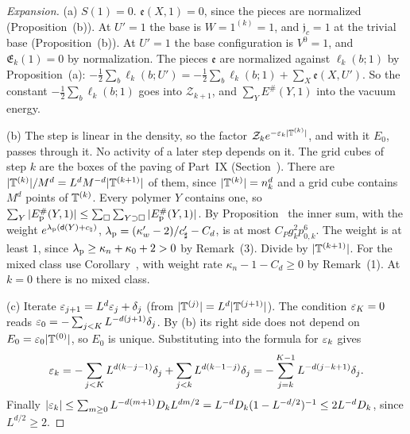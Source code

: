 \begin{proof}[Expansion]
(a) $S(1)=0$. $\mathfrak e(X,1)=0$, since the pieces are normalized (Proposition~(b)). At $U'=1$ the base is $W=1^{(k)}=1$, and $\mathfrak j_c=1$ at the trivial base (Proposition~(b)). At $U'=1$ the base configuration is $V^0=1$, and $\mathfrak E_k(1)=0$ by normalization. The pieces $\mathfrak e$ are normalized against $\ell_k(b;1)$ by Proposition~(a): $-\frac12\sum_b\ell_k(b;U')=-\frac12\sum_b\ell_k(b;1)+\sum_X\mathfrak e(X,U')$. So the constant $-\frac12\sum_b\ell_k(b;1)$ goes into $\mathcal Z_{k+1}$, and $\sum_YE^\#(Y,1)$ into the vacuum energy.

(b) The step is linear in the density, so the factor $\mathcal Z_ke^{-\varepsilon_k|\mathbb T^{(k)}|}$, and with it $E_0$, passes through it. No activity of a later step depends on it. The grid cubes of step $k$ are the boxes of the paving of Part~IX (Section~). There are $|\mathbb T^{(k)}|/M^d=L^dM^{-d}|\mathbb T^{(k+1)}|$ of them, since $|\mathbb T^{(k)}|=n_k^d$ and a grid cube contains $M^d$ points of $\mathbb T^{(k)}$. Every polymer $Y$ contains one, so $\sum_Y|E^\#_{\rm p}(Y,1)|\le\sum_\Box\sum_{Y\supset\Box}|E^\#_{\rm p}(Y,1)|$. By Proposition~ the inner sum, with the weight $e^{\lambda_{\rm p}(\mathsf d(Y)+c_\natural)}$, $\lambda_{\rm p}=(\kappa'_w-2)/c'_\sharp-C_d$, is at most $C_Pg_k^2p_{0,k}^6$. The weight is at least $1$, since $\lambda_{\rm p}\ge\kappa_n+\kappa_0+2>0$ by Remark~(3). Divide by $|\mathbb T^{(k+1)}|$. For the mixed class use Corollary~, with weight rate $\kappa_n-1-C_d\ge0$ by Remark~(1). At $k=0$ there is no mixed class.

(c) Iterate $\varepsilon_{j+1}=L^d\varepsilon_j+\delta_j$ (from $|\mathbb T^{(j)}|=L^d|\mathbb T^{(j+1)}|$). The condition $\varepsilon_K=0$ reads $\varepsilon_0=-\sum_{j<K}L^{-d(j+1)}\delta_j$. By (b) its right side does not depend on $E_0=\varepsilon_0|\mathbb T^{(0)}|$, so $E_0$ is unique. Substituting into the formula for $\varepsilon_k$ gives
\[
\varepsilon_k=-\sum_{j<K}L^{d(k-j-1)}\delta_j+\sum_{j<k}L^{d(k-1-j)}\delta_j=-\sum_{j=k}^{K-1}L^{-d(j-k+1)}\delta_j .
\]
Finally $|\varepsilon_k|\le\sum_{m\ge0}L^{-d(m+1)}D_kL^{dm/2}=L^{-d}D_k(1-L^{-d/2})^{-1}\le2L^{-d}D_k$, since $L^{d/2}\ge2$.
\end{proof}

